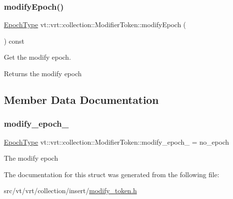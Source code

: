 \subsubsection{\texorpdfstring{modify\+Epoch()}{modifyEpoch()}}
{\footnotesize\ttfamily \hyperlink{namespacevt_a985a5adf291c34a3ca263b3378388236}{Epoch\+Type} vt\+::vrt\+::collection\+::\+Modifier\+Token\+::modify\+Epoch (\begin{DoxyParamCaption}{ }\end{DoxyParamCaption}) const\hspace{0.3cm}{\ttfamily [inline]}}



Get the modify epoch. 

\begin{DoxyReturn}{Returns}
the modify epoch 
\end{DoxyReturn}


\subsection{Member Data Documentation}
\mbox{\label{structvt_1_1vrt_1_1collection_1_1_modifier_token_a3c0115cdf4a5097aa9ff940b0e8c9172}} 
\subsubsection{\texorpdfstring{modify\+\_\+epoch\+\_\+}{modify\_epoch\_}}
{\footnotesize\ttfamily \hyperlink{namespacevt_a985a5adf291c34a3ca263b3378388236}{Epoch\+Type} vt\+::vrt\+::collection\+::\+Modifier\+Token\+::modify\+\_\+epoch\+\_\+ = no\+\_\+epoch\hspace{0.3cm}{\ttfamily [private]}}

The modify epoch 

The documentation for this struct was generated from the following file\+:\begin{DoxyCompactItemize}
\item 
src/vt/vrt/collection/insert/\hyperlink{modify__token_8h}{modify\+\_\+token.\+h}\end{DoxyCompactItemize}

